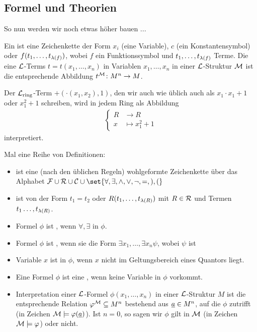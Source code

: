 \subsection{Formel und Theorien}
So nun werden wir noch etwas höher bauen ...
\begin{definition}
	Ein  ist eine Zeichenkette der Form $x_i$ (eine Variable), $c$ (ein Konstantensymbol) oder $f(t_1, \dots, t_{\lambda(f)})$, wobei $f$ ein Funktionssymbol und $t_1, \dots, t_{\lambda(f)}$ Terme. Die  eine $\mathcal L$-Terms $t = t(x_1,\dots, x_n)$ in Variablen $x_1, \dots, x_n$ in einer $\mathcal L$-Struktur $\mathcal M$ ist die entsprechende Abbildung $t^{\mathcal M}\colon M^n \to M$.
\end{definition}
\begin{example}
	Der $\mathcal L_{\operatorname{ring}}$-Term $+(\cdot(x_1,x_2),1)$, den wir auch wie üblich auch als $x_1 \cdot x_1 + 1$ oder $x_1^2 + 1$ schreiben, wird in jedem Ring als Abbildung
	\begin{align*}
		\begin{cases}
			R &\to R\\
			x &\mapsto x_1^2+1
		\end{cases}
	\end{align*}
	interpretiert.
\end{example}
\begin{definition}
	Mal eine Reihe von Definitionen:
	\begin{itemize}
		\item {} ist eine (nach den üblichen Regeln) wohlgeformte Zeichenkette über das Alphabet $\FF\cup \RR\cup \CC \cup \set{\forall, \exists, \wedge,\vee, \neg, =, ),(}$
		\item {} ist von der Form $t_1 = t_2$ oder $R(t_1,\dots, t_{\lambda(R)})$ mit $R\in \mathcal R$ und Termen $t_1 \dots, t_{\lambda(R)}$.
		\item Formel $\phi$ ist , wenn  $\forall, \exists$ in $\phi$.
		\item Formel $\phi$ ist , wenn sie die Form $\exists x_1, \dots, \exists x_n \psi$, wobei $\psi$  ist
		\item Variable $x$ ist  in $\phi$, wenn $x$ nicht im Geltungsbereich eines Quantors liegt.
		\item Eine Formel $\phi$ ist eine , wenn keine Variable in $\phi$  vorkommt.
		\item Interpretation einer $\mathcal L$-Formel $\phi(x_1, \dots, x_n)$ in einer $\mathcal L$-Struktur $M$ ist die entsprechende Relation $\varphi^{\mathcal M} \subseteq M^n$ bestehend aus $\underline{a} \in M^n$, auf die $\phi$ zutrifft (in Zeichen $\mathcal M \models \varphi(\underline{a})$). Ist $n = 0$, so sagen wir $\phi$ gilt in $\mathcal M$ (in Zeichen $\mathcal M \models \varphi$) oder nicht.
	\end{itemize}
\end{definition}
